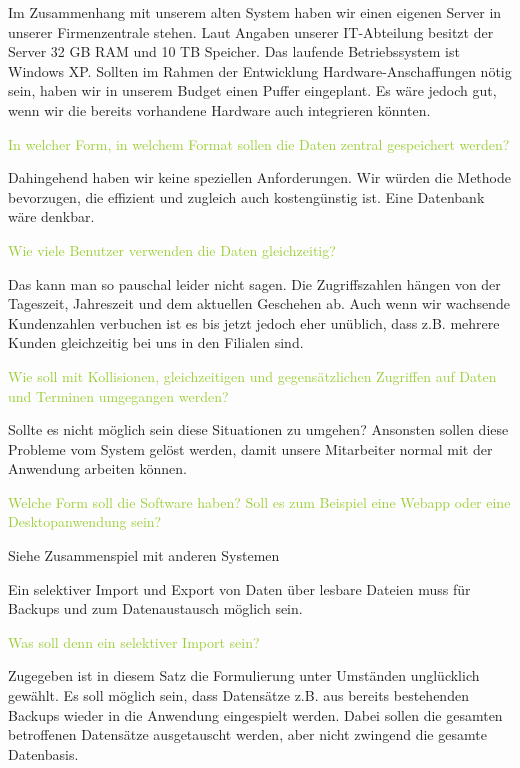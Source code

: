\textcolor{NavyBlue}{Im Zusammenhang mit unserem alten System haben wir einen eigenen Server in unserer Firmenzentrale stehen. Laut Angaben unserer IT-Abteilung besitzt der Server 32 GB RAM und 10 TB Speicher. Das laufende Betriebssystem ist Windows XP.
Sollten im Rahmen der Entwicklung Hardware-Anschaffungen nötig sein, haben wir in unserem Budget einen Puffer eingeplant. Es wäre jedoch gut, wenn wir die bereits vorhandene Hardware auch integrieren könnten.}

\textcolor{YellowGreen}{In welcher Form, in welchem Format sollen die Daten zentral gespeichert werden?}

\textcolor{NavyBlue}{Dahingehend haben wir keine speziellen Anforderungen. Wir würden die Methode bevorzugen, die effizient und zugleich auch kostengünstig ist. Eine Datenbank wäre denkbar.}

\textcolor{YellowGreen}{Wie viele Benutzer verwenden die Daten gleichzeitig?}

\textcolor{NavyBlue}{Das kann man so pauschal leider nicht sagen. Die Zugriffszahlen hängen von der Tageszeit, Jahreszeit und dem aktuellen Geschehen ab. Auch wenn wir wachsende Kundenzahlen verbuchen ist es bis jetzt jedoch eher unüblich, dass z.B. mehrere Kunden gleichzeitig bei uns in den Filialen sind. }

\textcolor{YellowGreen}{Wie soll mit Kollisionen, gleichzeitigen und gegensätzlichen Zugriffen auf Daten und Terminen umgegangen werden?}

\textcolor{NavyBlue}{Sollte es nicht möglich sein diese Situationen zu umgehen? Ansonsten sollen diese Probleme vom System gelöst werden, damit unsere Mitarbeiter normal mit der Anwendung arbeiten können.}

\textcolor{YellowGreen}{Welche Form soll die Software haben? Soll es zum Beispiel eine Webapp oder eine Desktopanwendung sein?}

\textcolor{NavyBlue}{Siehe Zusammenspiel mit anderen Systemen}

Ein selektiver Import und Export von Daten über lesbare Dateien muss für Backups und zum Datenaustausch möglich sein. 

\textcolor{YellowGreen}{Was soll denn ein selektiver Import sein?}

\textcolor{NavyBlue}{Zugegeben ist in diesem Satz die Formulierung unter Umständen unglücklich gewählt. Es soll möglich sein, dass Datensätze z.B. aus bereits bestehenden Backups wieder in die Anwendung eingespielt werden. Dabei sollen die gesamten betroffenen Datensätze ausgetauscht werden, aber nicht zwingend die gesamte Datenbasis.}

